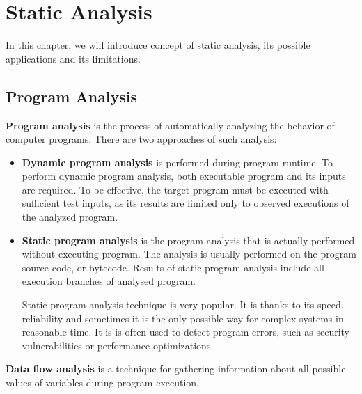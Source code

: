 
\chapter{Static Analysis \label{chapter:analysis}}


In this chapter, we will introduce concept of static analysis,
its possible applications and its limitations.

\section{Program Analysis}

\textbf{Program analysis} is the process of automatically analyzing the behavior
of computer programs. There are two approaches of such analysis:
\begin{itemize}
  \item \textbf{Dynamic program analysis} is performed during program runtime.
    To perform dynamic program analysis, both executable program
    and its inputs are required. To be effective, the target program
    must be executed with sufficient test inputs, as its results
    are limited only to observed executions of the analyzed program.
  \item \textbf{Static program analysis} is the program analysis that is actually
    performed without executing program. The analysis is usually
    performed on the program source code, or bytecode.
    Results of static program analysis include all execution branches of
    analysed program.

    Static program analysis technique is very popular. It is thanks
    to its speed, reliability and sometimes it is the only possible
    way for complex systems in reasonable time.
    It is is often used to detect program errors, such as
    security vulnerabilities or performance optimizations.
\end{itemize}

\textbf{Data flow analysis} is a technique for gathering information about
all possible values of variables during program execution.



